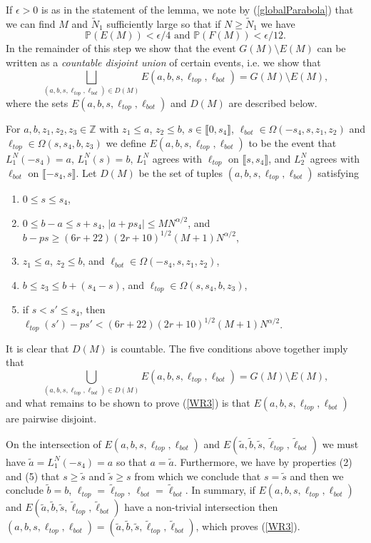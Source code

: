 If $\epsilon > 0$ is as in the statement of the lemma, we note by (\ref{globalParabola}) that we can find $M$ and $\tilde{N}_1$ sufficiently large so that if $N \geq \tilde{N}_1$ we have 
\begin{equation}\label{4.2EFbounds}
\mathbb{P}(E(M)) < \epsilon/4 \mbox{ and } \mathbb{P}(F(M)) < \epsilon/12.
\end{equation}
In the remainder of this step we show that the event $G(M) \setminus E(M)$ can be written as a {\em countable disjoint union} of certain events, i.e. we show that
\begin{equation}\label{WR3}
\bigsqcup\limits_{(a,b,s,\ell_{top},\ell_{bot}) \in D(M)}  E(a,b,s,\ell_{top},\ell_{bot}) = G(M) \setminus E(M),
\end{equation}
where the sets $E(a,b,s,\ell_{top},\ell_{bot})$ and $D(M)$ are described below. 

For $a,b,z_1,z_2,z_3 \in\mathbb{Z}$ with $z_1\leq a$, $z_2\leq b$, $s\in\llbracket 0, s_4 \rrbracket$, $\ell_{bot}\in\Omega(-s_4,s,z_1,z_2)$ and $\ell_{top}\in\Omega(s,s_4,b,z_3)$ we define $E(a,b,s,\ell_{top},\ell_{bot})$ to be the event that $L_1^N(-s_4) = a$, $L_1^N(s) = b$, $L_1^N$ agrees with $\ell_{top}$ on $\llbracket s,s_4\rrbracket$, and $L_2^N$ agrees with $\ell_{bot}$ on $\llbracket -s_4,s \rrbracket$.  Let $D(M)$ be the set of tuples $(a,b,s, \ell_{top}, \ell_{bot})$ satisfying
\begin{enumerate}[label=(\arabic*)]
	\item $0\leq s\leq s_4$,
	\item $0\leq b-a \leq s + s_4$, $|a + ps_4| \leq MN^{\alpha/2}$, and $b-ps \geq (6r+22)(2r+10)^{1/2}(M+1)N^{\alpha/2}$,
	\item $z_1\leq a$, $z_2\leq b$, and $\ell_{bot}\in\Omega(-s_4, s, z_1, z_2)$,
	\item $b \leq z_3 \leq b + (s_4 - s)$, and $\ell_{top} \in\Omega(s, s_4, b, z_3)$,
	\item if $s < s' \leq s_4$, then $\ell_{top}(s') -ps' < (6r+22)(2r+10)^{1/2}(M+1)N^{\alpha/2}$.
\end{enumerate}
It is clear that $D(M)$ is countable. The five conditions above together imply that 
$$\bigcup_{(a,b,s,\ell_{top},\ell_{bot}) \in D(M)}  E(a,b,s,\ell_{top},\ell_{bot}) = G(M) \setminus E(M),$$
and what remains to be shown to prove (\ref{WR3}) is that $E(a,b,s,\ell_{top},\ell_{bot})$ are pairwise disjoint. 

On the intersection of $E(a,b,s,\ell_{top},\ell_{bot})$ and $E(\tilde{a},\tilde{b},\tilde{s},\tilde{\ell}_{top},\tilde{\ell}_{bot})$ we must have $\tilde{a} = L_1^N(-s_4) = a$ so that $a = \tilde{a}$. Furthermore, we have by properties (2) and (5) that $s \geq \tilde{s}$ and $\tilde{s} \geq s$ from which we conclude that $s= \tilde{s}$ and then we conclude $\tilde{b} = b$, $\ell_{top} = \tilde{\ell}_{top}$, $\ell_{bot} = \tilde{\ell}_{bot}$. In summary, if $E(a,b,s,\ell_{top},\ell_{bot})$ and $E(\tilde{a},\tilde{b},\tilde{s},\tilde{\ell}_{top},\tilde{\ell}_{bot})$ have a non-trivial intersection then $(a,b,s,\ell_{top},\ell_{bot}) = (\tilde{a},\tilde{b},\tilde{s},\tilde{\ell}_{top},\tilde{\ell}_{bot})$, which proves (\ref{WR3}).\\

